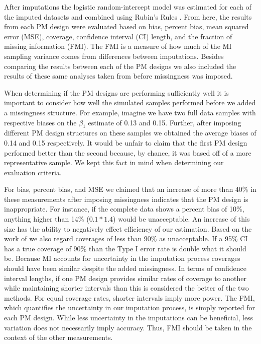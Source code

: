 \documentclass{svjour3}                     %
\begin{document}
After imputations the logistic random-intercept model was estimated for each of the imputed datasets and combined using Rubin's Rules \citep{rubin2004multiple}. From here, the results from each PM design were evaluated based on bias, percent bias, mean squared error (MSE), coverage, confidence interval (CI) length, and the fraction of missing information (FMI). The FMI is a measure of how much of the MI sampling variance comes from differences between imputations. Besides comparing the results between each of the PM designs we also included the results of these same analyses taken from before missingness was imposed. \par

When determining if the PM designs are performing sufficiently well it is important to consider how well the simulated samples performed before we added a missingness structure. For example, imagine we have two full data samples with respective biases on the $\beta_1$ estimate of 0.13 and 0.15. Further, after imposing different PM design structures on these samples we obtained the average biases of 0.14 and 0.15 respectively. It would be unfair to claim that the first
PM design performed better than the second because, by chance, it was based off of a more representative sample. We kept this fact in mind when determining our evaluation criteria. \par

For bias, percent bias, and MSE we claimed that an increase of more than 40\% in these measurements after imposing missingness indicates that the PM design is inappropriate. For instance, if the complete data shows a percent bias of 10\%, anything higher than 14\% ($0.1*1.4$) would be unacceptable. An increase of this size has the ability to negatively effect efficiency of our estimation. Based on the work of \citet{collins2001comparison} we also regard coverages of less than 90\% as unacceptable. If a 95\% CI has a true coverage of 90\% than the Type I error rate is double what it should be. Because MI accounts for uncertainty in the imputation process coverages should have been similar despite the added missingness. In terms of confidence interval lengths, if one PM design provides similar rates of coverage to another while maintaining shorter intervals than this is considered the better of the two methods. For equal coverage rates, shorter intervals imply more power. The FMI, which quantifies the uncertainty in our imputation process, is simply reported for each PM design. While less uncertainty in the imputations can be beneficial, less variation does not necessarily imply accuracy. Thus, FMI should be taken in the context of the other measurements. \par
\end{document}
